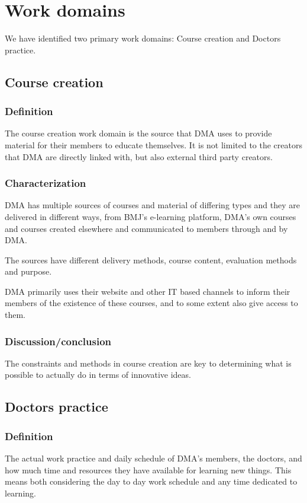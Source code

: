\section{Work domains}
We have identified two primary work domains: Course creation and Doctors practice.

\subsection{Course creation}
\subsubsection{Definition}
The course creation work domain is the source that DMA uses to provide material for their members to educate themselves. It is not limited to the creators that DMA are directly linked with, but also external third party creators.

\subsubsection{Characterization}
DMA has multiple sources of courses and material of differing types and they are delivered in different ways, from BMJ’s e-learning platform, DMA’s own courses and courses created elsewhere and communicated to members through and by DMA.

The sources have different delivery methods, course content, evaluation methods and purpose.

DMA primarily uses their website and other IT based channels to inform their members of the existence of these courses, and to some extent also give access to them.

\subsubsection{Discussion/conclusion}
The constraints and methods in course creation are key to determining what is possible to actually do in terms of innovative ideas.

\subsection{Doctors practice}
\subsubsection{Definition}
The actual work practice and daily schedule of DMA’s members, the doctors, and how much time and resources they have available for learning new things. This means both considering the day to day work schedule and any time dedicated to learning.

